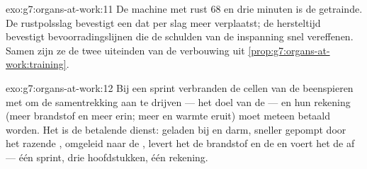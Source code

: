 \begin{solution}{exo:g7:organs-at-work:11}
De machine met rust $68$ en drie minuten is de getrainde. De rustpolsslag
bevestigt een  dat per slag meer verplaatst; de hersteltijd bevestigt
bevoorradingslijnen die de schulden van de inspanning snel vereffenen.
Samen zijn ze de twee uiteinden van de verbouwing uit
\cref{prop:g7:organs-at-work:training}.
\end{solution}

\begin{solution}{exo:g7:organs-at-work:12}
Bij een sprint verbranden de cellen van de beenspieren  met
 om de samentrekking aan te drijven --- het doel van de 
--- en hun rekening (meer brandstof en meer  erin; meer
 en warmte eruit) moet meteen betaald worden. Het  is
de betalende dienst: geladen bij  en darm, sneller gepompt door het
razende , omgeleid naar de , levert het de brandstof en de
 en voert het de  af --- één sprint, drie
hoofdstukken, één rekening.
\end{solution}

